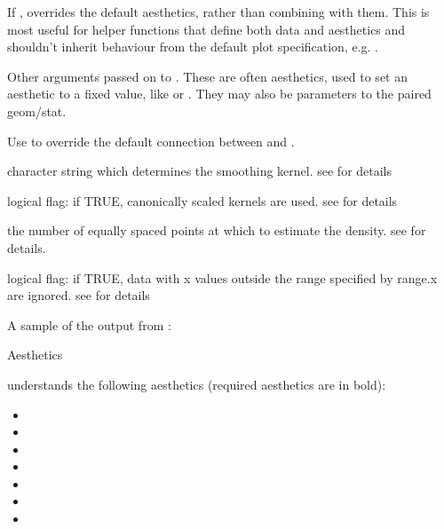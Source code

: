 \documentclass[a4paper]{book}
\begin{document}
\begin{Arguments}
\begin{ldescription}
\item[\code{inherit.aes}] If , overrides the default aesthetics,
rather than combining with them. This is most useful for helper functions
that define both data and aesthetics and shouldn't inherit behaviour from
the default plot specification, e.g. .

\item[\code{...}] Other arguments passed on to . These are
often aesthetics, used to set an aesthetic to a fixed value, like
 or . They may also be parameters
to the paired geom/stat.

\item[\code{geom}, \code{stat}] Use to override the default connection between
 and .

\item[\code{kernel}] character string which determines the smoothing kernel. see
 for details

\item[\code{canonical}] logical flag: if TRUE, canonically scaled kernels are used.
see  for details

\item[\code{gridsize}] the number of equally spaced points at which to estimate the
density. see  for details.

\item[\code{truncate}] logical flag: if TRUE, data with x values outside the range
specified by range.x are ignored. see 
for details
\end{ldescription}
\end{Arguments}
%
\begin{Details}



A sample of the output from :


\end{Details}
%
\begin{Section}{Aesthetics}

 understands the following aesthetics (required aesthetics
are in bold):
\begin{itemize}

\item{} 
\item{} 
\item{} 
\item{} 
\item{} 
\item{} 
\item{} 

\end{itemize}

\end{Section}
\end{document}

